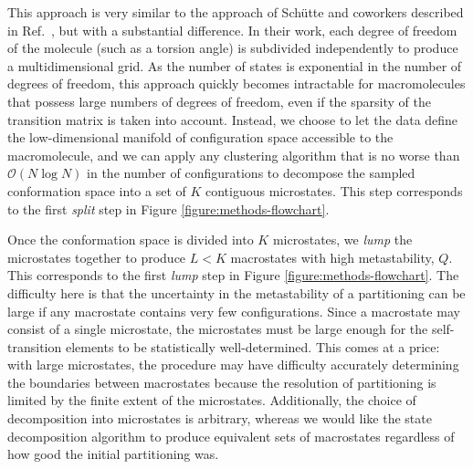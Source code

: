 This approach is very similar to the approach of Sch\"{u}tte and coworkers described in Ref.\ \cite{schuette:1999a}, but with a substantial difference.
In their work, each degree of freedom of the molecule (such as a torsion angle) is subdivided independently to produce a multidimensional grid.
As the number of states is exponential in the number of degrees of freedom, this approach quickly becomes intractable for macromolecules that possess large numbers of degrees of freedom, even if the sparsity of the transition matrix is taken into account.
Instead, we choose to let the data define the low-dimensional manifold of configuration space accessible to the macromolecule, and we can apply any clustering algorithm that is no worse than $\mathcal{O}(N \log N)$ in the number of configurations to decompose the sampled conformation space into a set of $K$ contiguous microstates.
This step corresponds to the first \emph{split} step in Figure \ref{figure:methods-flowchart}.

Once the conformation space is divided into $K$ microstates, we \emph{lump} the microstates together to produce $L < K$ macrostates with high metastability, $Q$.
This corresponds to the first \emph{lump} step in Figure \ref{figure:methods-flowchart}.  
The difficulty here is that the uncertainty in the metastability of a partitioning can be large if any macrostate contains very few configurations.
Since a macrostate may consist of a single microstate, the microstates must be large enough for the self-transition elements to be statistically well-determined.
This comes at a price: with large microstates, the procedure may have difficulty accurately determining the boundaries between macrostates because the resolution of partitioning is limited by the finite extent of the microstates.
Additionally, the choice of decomposition into microstates is arbitrary, whereas we would like the state decomposition algorithm to produce equivalent sets of macrostates regardless of how good the initial partitioning was.

